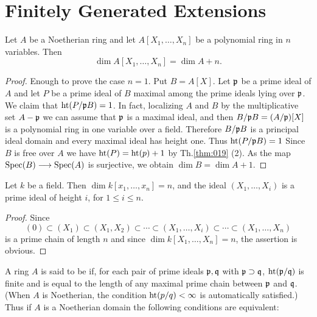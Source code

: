 \documentclass[../main]{subfiles}
\begin{document}
\section{Finitely Generated Extensions}\label{sec:14}

\begin{partheorem}\label{thm:022}
Let $A$ be a Noetherian ring and let $A[X_1, \ldots, X_n]$ be a polynomial ring in $n$ variables. Then \[\dim A[X_1, \ldots, X_n]=\dim A+n.\]
\end{partheorem}

\begin{proof}
Enough to prove the case $n=1$. Put $B=A[X]$. Let $\mathfrak{p}$ be a prime ideal of $A$ and let $P$ be a prime ideal of $B$ maximal among the prime ideals lying over $\mathfrak{p}$. We claim that $\operatorname{ht}(P /\mathfrak{p}B)=1$. In fact, localizing $A$ and $B$ by the multiplicative set $A-\mathfrak{p}$ we can assume that $\mathfrak{p}$ is a maximal ideal, and then $B / \mathfrak{p} B=(A / \mathfrak{p})[X]$ is a polynomial ring in one variable over a field. Therefore $B / \mathfrak{p} B$ is a principal ideal domain and every maximal ideal has height one. Thus $\operatorname{ht}(P / \mathfrak{p} B)=1$ Since $B$ is free over $A$ we have $\operatorname{ht}(P)=\operatorname{ht}(p)+1$ by Th.\ref{thm:019} (2). As the map $\operatorname{Spec}(B) \longrightarrow \operatorname{Spec}(A)$ is surjective, we obtain $\dim B=\dim A+1$.
\end{proof}

\begin{corollary}\label{cor:14.01}
Let $k$ be a field. Then $\dim k[x_1, \ldots, x_n]=n$, and the ideal $(X_1, \ldots, X_i)$ is a prime ideal of height $i$, for $1 \leqslant i \leqslant n$.
\end{corollary}

\begin{proof}
Since \[(0) \subset (X_1) \subset(X_1, X_2) \subset \cdots \subset(X_1, \ldots, X_i) \subset \cdots \subset(X_1, \ldots, X_n)\] is a prime chain of length $n$ and since $\dim k[X_1, \ldots, X_n]=n$, the assertion is obvious.
\end{proof}

\newparagraph
A ring $A$ is said to be  if, for each pair of prime ideals $\mathfrak{p}, \mathfrak{q}$ with $\mathfrak{p} \supset \mathfrak{q}$, $\operatorname{ht}(\mathfrak{p} / \mathfrak{q})$ is finite and is equal to the length of any maximal prime chain between $\mathfrak{p}$ and $\mathfrak{q}$. (When $A$ is Noetherian, the condition $\operatorname{ht}(p / q)<\infty$ is automatically satisfied.) Thus if $A$ is a Noetherian domain the following conditions are equivalent:
\end{document}
